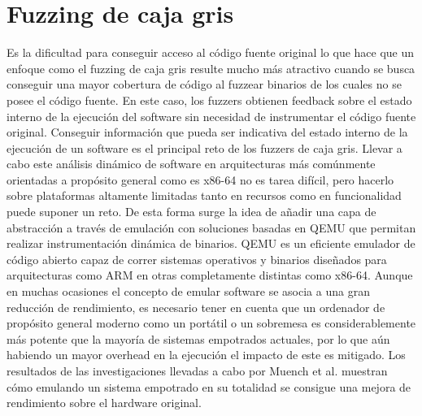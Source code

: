 \section{Fuzzing de caja gris}
Es la dificultad para conseguir acceso al código fuente original lo que hace que un enfoque como el fuzzing de caja gris resulte mucho más atractivo 
cuando se busca conseguir una mayor cobertura de código al fuzzear binarios de los cuales no se posee el código fuente. En este caso, los fuzzers obtienen 
feedback sobre el estado interno de la ejecución del software sin necesidad de instrumentar el código fuente original. Conseguir información que pueda ser
indicativa del estado interno de la ejecución de un software es el principal reto de los fuzzers de caja gris. 
Llevar a cabo este análisis dinámico de software en arquitecturas más comúnmente orientadas a 
propósito general como es x86-64 no es tarea difícil, pero hacerlo sobre plataformas altamente limitadas tanto en recursos como en funcionalidad
puede suponer un reto. De esta forma surge la idea de añadir una capa de abstracción a través de emulación con soluciones basadas en QEMU\cite{qemu}
que permitan realizar instrumentación dinámica de binarios. QEMU es un eficiente emulador de código abierto capaz de correr sistemas operativos y binarios
diseñados para arquitecturas como ARM en otras completamente distintas como x86-64. Aunque en muchas ocasiones el concepto de emular software se asocia a
una gran reducción de rendimiento, es necesario tener en cuenta que un ordenador de propósito general moderno como un portátil o un sobremesa es 
considerablemente más potente que la mayoría de sistemas empotrados actuales, por lo que aún habiendo un mayor overhead en la ejecución el impacto de este es mitigado.
Los resultados de las investigaciones llevadas a cabo por Muench et al.\cite{Muench2018} muestran cómo emulando un sistema empotrado en su totalidad 
se consigue una mejora de rendimiento sobre el hardware original.

